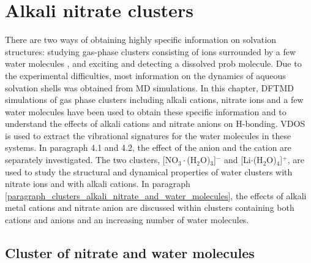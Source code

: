   \chapter{Alkali nitrate clusters}\label{CHAPTER_results_clusters}
There are two ways of obtaining highly specific information on solvation structures: studying gas-phase clusters consisting of ions surrounded by a few water molecules \cite{Weber2000,Kropman2001},
and exciting and detecting a dissolved prob molecule\cite{Jimenez1994}.
Due to the experimental difficulties, most information on the dynamics of aqueous solvation shells was obtained from MD simulations\cite{Smith1994,Chandra2000}.
  In this chapter, DFTMD simulations of gas phase clusters including alkali cations, nitrate ions and a few water molecules have been used to obtain these specific information and to understand the
  effects of alkali cations and nitrate anions on H-bonding\cite{jiangling2010,heine2015}. 
  VDOS is used to extract the vibrational signatures for the water molecules in these systems.
  In paragraph 4.1 and 4.2, the effect of the anion and the cation are separately investigated. 
  The two clusters, [NO$_3\cdot$(H$_2$O)$_3$]$^-$ and [Li$\cdot$(H$_2$O)$_4$]$^+$, are used 
  to study the structural and dynamical properties of water clusters with nitrate ions and with alkali cations. 
  In paragraph \ref{paragraph_clusters_alkali_nitrate_and_water_molecules}, the effects of alkali metal cations 
  and nitrate anion are discussed within clusters containing both cations and anions and an increasing number of water molecules.
  \section{Cluster of nitrate and water molecules}\label{paragraph_3w_nitrate}
  

